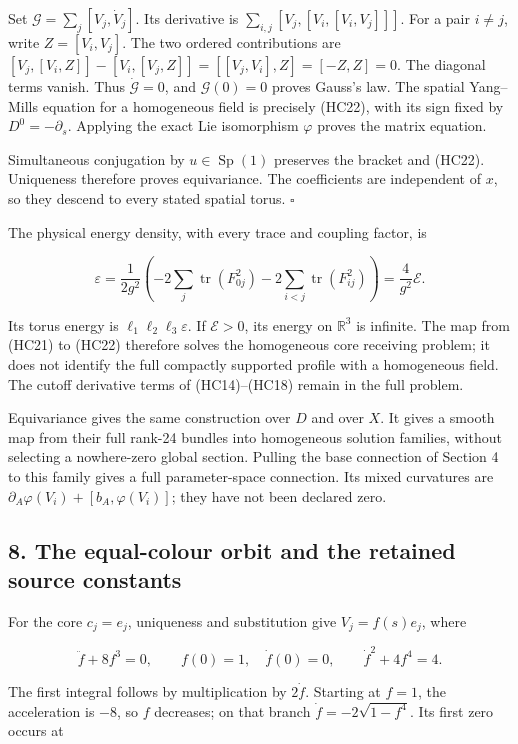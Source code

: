 \documentclass[11pt]{article}
\begin{document}
Set \(\mathcal G=\sum_j[V_j,\dot V_j]\). Its derivative is
\(\sum_{i,j}[V_j,[V_i,[V_i,V_j]]]\). For a pair \(i\ne j\), write
\(Z=[V_i,V_j]\). The two ordered contributions are
\([V_j,[V_i,Z]]-[V_i,[V_j,Z]]=[[V_j,V_i],Z]=[-Z,Z]=0\).
The diagonal terms vanish. Thus \(\dot{\mathcal G}=0\), and
\(\mathcal G(0)=0\) proves Gauss's law. The spatial Yang–Mills equation
for a homogeneous field is precisely (HC22), with its sign fixed by
\(D^0=-\partial_s\). Applying the exact Lie isomorphism \(\varphi\)
proves the matrix equation.

Simultaneous conjugation by \(u\in\operatorname{Sp}(1)\) preserves
the bracket and (HC22). Uniqueness therefore proves equivariance.
The coefficients are independent of \(x\), so they descend to every
stated spatial torus. \(\square\)

The physical energy density, with every trace and coupling factor, is

\[
 \varepsilon=\frac1{2g^2}\left(
 -2\sum_j\operatorname{tr}(F_{0j}^2)
 -2\sum_{i<j}\operatorname{tr}(F_{ij}^2)\right)
 =\frac4{g^2}\mathcal E.
 \tag{HC24}
\]

Its torus energy is \(\ell_1\ell_2\ell_3\varepsilon\). If
\(\mathcal E>0\), its energy on \(\mathbb R^3\) is infinite. The map
from (HC21) to (HC22) therefore solves the homogeneous core receiving
problem; it does not identify the full compactly supported profile with
a homogeneous field. The cutoff derivative terms of (HC14)–(HC18)
remain in the full problem.

Equivariance gives the same construction over \(D\) and over \(X\).
It gives a smooth map from their full rank-24 bundles into homogeneous
solution families, without selecting a nowhere-zero global section.
Pulling the base connection of Section 4 to this family gives a full
parameter-space connection. Its mixed curvatures are
\(\partial_A\varphi(V_i)+[b_A,\varphi(V_i)]\); they have not been
declared zero.

\subsection*{8. The equal-colour orbit and the retained source constants}

For the core \(c_j=e_j\), uniqueness and substitution give
\(V_j=f(s)e_j\), where

\[
 \ddot f+8f^3=0,\qquad f(0)=1,\quad\dot f(0)=0,
 \qquad \dot f^2+4f^4=4.
 \tag{HC25}
\]

The first integral follows by multiplication by \(2\dot f\).
Starting at \(f=1\), the acceleration is \(-8\), so \(f\) decreases;
on that branch \(\dot f=-2\sqrt{1-f^4}\). Its first zero occurs at
\end{document}
